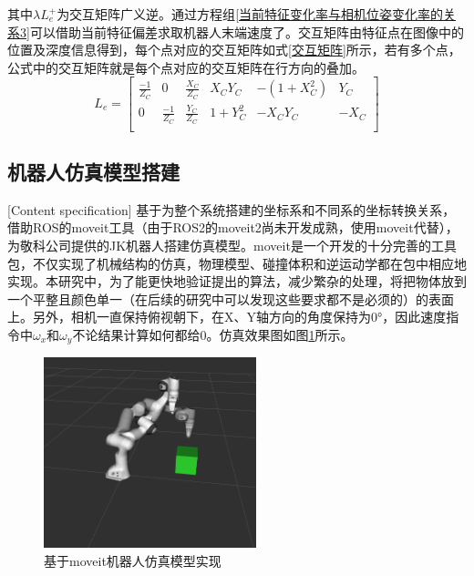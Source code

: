 \documentclass[fontset=fandol,type=bachelor,campus=harbin,bsmainpagenumberline=true]{hithesisbook}
\begin{document}
其中$\lambda L_{e}^{+}$为交互矩阵广义逆。通过方程组\ref{当前特征变化率与相机位姿变化率的关系3}可以借助当前特征偏差求取机器人末端速度了。交互矩阵由特征点在图像中的位置及深度信息得到，每个点对应的交互矩阵如式\ref{交互矩阵}所示，若有多个点，公式中的交互矩阵就是每个点对应的交互矩阵在行方向的叠加。
 \begin{equation}
L_e=\left[ \begin{matrix}
	\frac{-1}{Z_C}&		0&		\frac{X_C}{Z_C}&		X_CY_C&		-\left( 1+X_{C}^{2} \right)&		Y_C\\
	0&		\frac{-1}{Z_C}&		\frac{Y_C}{Z_C}&		1+Y_{C}^{2}&		-X_CY_C&		-X_C\\
\end{matrix} \right] 
\label{交互矩阵} 
\end{equation} 

\subsection{机器人仿真模型搭建}[Content specification]
基于为整个系统搭建的坐标系和不同系的坐标转换关系，借助ROS的moveit工具（由于ROS2的moveit2尚未开发成熟，使用moveit代替），为敬科公司提供的JK机器人搭建仿真模型。moveit是一个开发的十分完善的工具包，不仅实现了机械结构的仿真，物理模型、碰撞体积和逆运动学都在包中相应地实现。本研究中，为了能更快地验证提出的算法，减少繁杂的处理，将把物体放到一个平整且颜色单一（在后续的研究中可以发现这些要求都不是必须的）的表面上。另外，相机一直保持俯视朝下，在X、Y轴方向的角度保持为0°，因此速度指令中$\omega _x$和$\omega _y$不论结果计算如何都给0。仿真效果图如图\ref{基于moveit机器人仿真模型实现}所示。
\begin{figure}[h]
\centering
\includegraphics[width = 0.55\textwidth]{chapter2/基于moveit机器人仿真模型实现}
\caption{基于moveit机器人仿真模型实现}
\label{基于moveit机器人仿真模型实现}
\end{figure}
\end{document}
